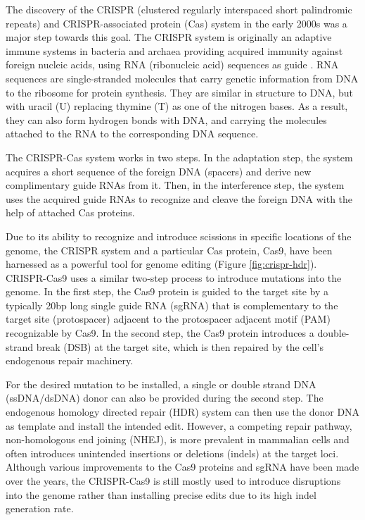 The discovery of the CRISPR (clustered regularly interspaced short palindromic repeats) and CRISPR-associated protein (Cas) system in the early 2000s was a major step towards this goal. The CRISPR system is originally an adaptive immune systems in bacteria and archaea providing acquired immunity against foreign nucleic acids, using RNA (ribonucleic acid) sequences as guide \cite{jiangCRISPRCas9Structures2017}. RNA sequences are single-stranded molecules that carry genetic information from DNA to the ribosome for protein synthesis. They are similar in structure to DNA, but with uracil (U) replacing thymine (T) as one of the nitrogen bases. As a result, they can also form hydrogen bonds with DNA, and carrying the molecules attached to the RNA to the corresponding DNA sequence\cite{BrockBiologyMicroorganisms}.

The CRISPR-Cas system works in two steps. In the adaptation step, the system acquires a short sequence of the foreign DNA (spacers) and derive new complimentary guide RNAs from it. Then, in the interference step, the system uses the acquired guide RNAs to recognize and cleave the foreign DNA with the help of attached Cas proteins\cite{garneauCRISPRCasBacterial2010}. 

Due to its ability to recognize and introduce scissions in specific locations of the genome, the CRISPR system and a particular Cas protein, Cas9, have been harnessed as a powerful tool for genome editing (Figure \ref{fig:crispr-hdr}). CRISPR-Cas9 uses a similar two-step process to introduce mutations into the genome. In the first step, the Cas9 protein is guided to the target site by a typically 20bp long single guide RNA (sgRNA) that is complementary to the target site (protospacer) adjacent to the protospacer adjacent motif (PAM) recognizable by Cas9. In the second step, the Cas9 protein introduces a double-strand break (DSB) at the target site, which is then repaired by the cell's endogenous repair machinery. 

For the desired mutation to be installed, a single or double strand DNA (ssDNA/dsDNA) donor can also be provided during the second step\cite{richardsonEnhancingHomologydirectedGenome2016,jasinRepairStrandBreaks2013}. The endogenous homology directed repair (HDR) system can then use the donor DNA as template and install the intended edit\cite{hsuDevelopmentApplicationsCRISPRCas92014}. However, a competing repair pathway, non-homologous end joining (NHEJ), is more prevalent in mammalian cells and often introduces unintended insertions or deletions (indels) at the target loci\cite{changNonhomologousDNAEnd2017}. Although various improvements to the Cas9 proteins and sgRNA have been made over the years, the CRISPR-Cas9 is still mostly used to introduce disruptions into the genome rather than installing precise edits due to its high indel generation rate\cite{kantorCRISPRCas9DNABaseEditing2020,koeppelPredictionPrimeEditing2023}.

